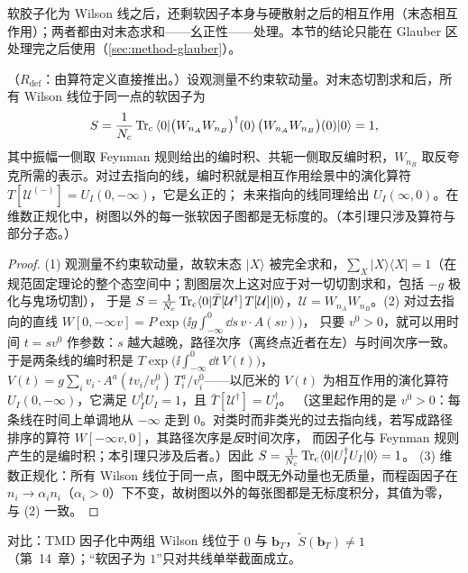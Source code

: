 软胶子化为 Wilson 线之后，还剩软因子本身与硬散射之后的相互作用（末态相互作用）；两者都由对末态求和——幺正性——处理。本节的结论只能在 Glauber 区处理完之后使用（\cref{sec:method-glauber}）。

\begin{lemma}\label{lem:method-soft-unitarity}
（$R_{\mathrm{def}}$：由算符定义直接推出。）设观测量不约束软动量。对末态切割求和后，所有 Wilson 线位于同一点的软因子为
\begin{equation}\label{eq:method-soft-one}
S=\frac1{N_c}\operatorname{Tr}_{\mathrm{c}}\,\langle0|\bigl(W_{n_A}W_{n_B}\bigr)^\dagger(0)\,\bigl(W_{n_A}W_{n_B}\bigr)(0)|0\rangle=1 ,
\end{equation}
其中振幅一侧取 Feynman 规则给出的编时积、共轭一侧取反编时积，$W_{n_B}$ 取反夸克所需的表示。对过去指向的线，编时积就是相互作用绘景中的演化算符 $T[\mathcal U^{(-)}]=U_I(0,-\infty)$，它是幺正的；
未来指向的线同理给出 $U_I(\infty,0)$。在维数正规化中，树图以外的每一张软因子图都是无标度的。（本引理只涉及算符与部分子态。）
\end{lemma}

\begin{proof}
(1) 观测量不约束软动量，故软末态 $|X\rangle$ 被完全求和，$\sum_X|X\rangle\langle X|=1$（在规范固定理论的整个态空间中；割图层次上这对应于对一切切割求和，包括 $-g$ 极化与鬼场切割），
于是 $S=\frac1{N_c}\operatorname{Tr}_{\mathrm{c}}\langle0|\bar T[\mathcal U^\dagger]\,T[\mathcal U]|0\rangle$，$\mathcal U=W_{n_A}W_{n_B}$。(2) 对过去指向的直线 $W[0,-\infty v]=P\exp\bigl(\ii g\int_{-\infty}^0\dd s\,v\cdot A(sv)\bigr)$，
只要 $v^0>0$，就可以用时间 $t=sv^0$ 作参数：$s$ 越大越晚，路径次序（离终点近者在左）与时间次序一致。于是两条线的编时积是
$T\exp\bigl(\ii\int_{-\infty}^0\dd t\,V(t)\bigr)$，$V(t)=g\sum_iv_i\cdot A^a(tv_i/v_i^0)\,T_i^a/v_i^0$——以厄米的 $V(t)$ 为相互作用的演化算符 $U_I(0,-\infty)$，它满足 $U_I^\dagger U_I=1$，且 $\bar T[\mathcal U^\dagger]=U_I^\dagger$。
（这里起作用的是 $v^0>0$：每条线在时间上单调地从 $-\infty$ 走到 $0$。对类时而非类光的过去指向线，若写成路径排序的算符 $W[-\infty v,0]$，其路径次序是\emph{反}时间次序，
而因子化与 Feynman 规则产生的是编时积；本引理只涉及后者。）因此 $S=\frac1{N_c}\operatorname{Tr}_{\mathrm{c}}\langle0|U_I^\dagger U_I|0\rangle=1$。
(3) 维数正规化：所有 Wilson 线位于同一点，图中既无外动量也无质量，而程函因子在 $n_i\to\alpha_in_i$（$\alpha_i>0$）下不变，故树图以外的每张图都是无标度积分，其值为零，与 (2) 一致。
\end{proof}

对比：TMD 因子化中两组 Wilson 线位于 $0$ 与 $\mathbf b_T$，$\tilde S(\mathbf b_T)\ne1$（第~14~章）；“软因子为 $1$”只对共线单举截面成立。

